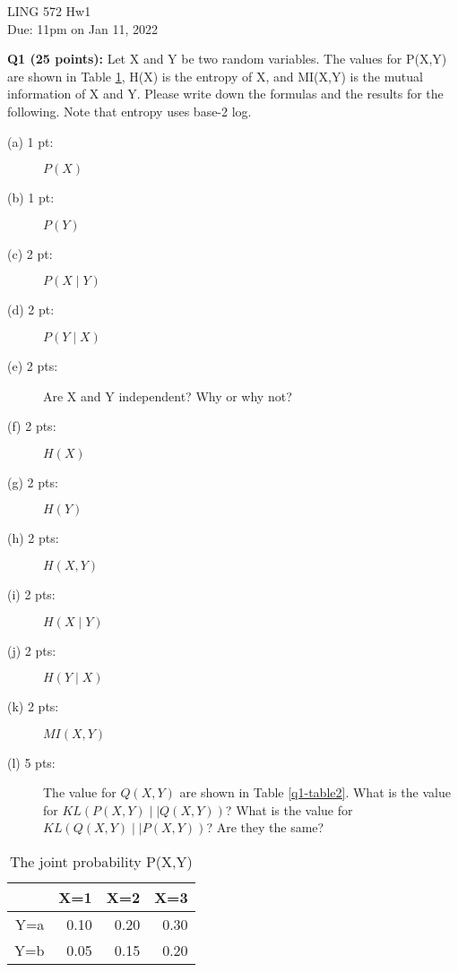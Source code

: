 \documentclass[11pt]{article}
\begin{document}
\begin{center}
\LARGE
LING 572 Hw1\\
Due: 11pm on Jan 11, 2022\\
\vspace{0.3in}
\end{center}


\vspace{0.2 in}
\hspace{-0.3in}
{\bf Q1 (25 points):} Let X and Y be two random variables. 
  The values for P(X,Y) are shown in Table \ref{q1-table1},
  H(X) is the entropy of X, and MI(X,Y) is the mutual information of X and Y.
  Please write down the formulas and the results for the following.
  Note that entropy uses base-2 log.
  

\begin{description}
   \item [(a) 1 pt:] $P(X)$
   \item [(b) 1 pt:] $P(Y)$
   \item [(c) 2 pt:] $P(X \mid Y)$
   \item [(d) 2 pt:] $P(Y \mid X)$
   \item [(e) 2 pts:] Are X and Y independent? Why or why not?

   \item [(f) 2 pts:] $H(X)$
   \item [(g) 2 pts:] $H(Y)$
   \item [(h) 2 pts:] $H(X,Y)$
   \item [(i) 2 pts:] $H(X \mid Y)$
   \item [(j) 2 pts:] $H(Y \mid X)$

   \item [(k) 2 pts:] $MI(X,Y)$
   \item [(l) 5 pts:] 
       The value for $Q(X,Y)$ are shown in Table \ref{q1-table2}.
                What is the value for $KL(P(X,Y) \mid\mid Q(X,Y))$?
                What is the value for $KL(Q(X,Y) \mid\mid P(X,Y))$?
                Are they the same?
\end{description}

\begin{table}[btph]
\centering
\caption{The joint probability P(X,Y)}
\label{q1-table1}
\begin{tabular}{|r|r|r|r|}  \hline
    & X=1 & X=2 & X=3 \\ \hline
Y=a & 0.10 & 0.20 &  0.30 \\ \hline 
Y=b & 0.05 & 0.15 &  0.20 \\ \hline
\end{tabular}
\end{table}
\end{document}
